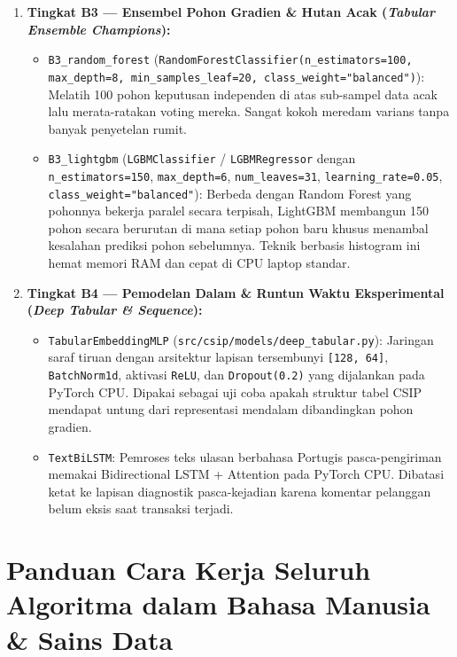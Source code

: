 \documentclass[11pt,a4paper,oneside]{book}
\newcommand{\code}[1]{{\small\nolinkurl{#1}}}
\begin{document}
\begin{enumerate}
\begin{itemize}
      \item \code{B2_naive_bayes} (\code{GaussianNB()}): Pengklasifikasi probabilistik cepat dengan asumsi fitur saling independen satu sama lain. Sering kali kurang terkalibrasi secara probabilitas, tetapi berharga sebagai pembanding berkecepatan mikrodetik.
    \end{itemize}
  \item \textbf{Tingkat B3 --- Ensembel Pohon Gradien \& Hutan Acak (\emph{Tabular Ensemble Champions}):}
    \begin{itemize}
      \item \code{B3_random_forest} (\code{RandomForestClassifier(n_estimators=100, max_depth=8, min_samples_leaf=20, class_weight="balanced")}): Melatih 100 pohon keputusan independen di atas sub-sampel data acak lalu merata-ratakan voting mereka. Sangat kokoh meredam varians tanpa banyak penyetelan rumit.
      \item \code{B3_lightgbm} (\code{LGBMClassifier} / \code{LGBMRegressor} dengan \code{n_estimators=150}, \code{max_depth=6}, \code{num_leaves=31}, \code{learning_rate=0.05}, \code{class_weight="balanced"}): Berbeda dengan Random Forest yang pohonnya bekerja paralel secara terpisah, LightGBM membangun 150 pohon secara berurutan di mana setiap pohon baru khusus menambal kesalahan prediksi pohon sebelumnya. Teknik berbasis histogram ini hemat memori RAM dan cepat di CPU laptop standar.
    \end{itemize}
  \item \textbf{Tingkat B4 --- Pemodelan Dalam \& Runtun Waktu Eksperimental (\emph{Deep Tabular \& Sequence}):}
    \begin{itemize}
      \item \code{TabularEmbeddingMLP} (\code{src/csip/models/deep_tabular.py}): Jaringan saraf tiruan dengan arsitektur lapisan tersembunyi \code{[128, 64]}, \code{BatchNorm1d}, aktivasi \code{ReLU}, dan \code{Dropout(0.2)} yang dijalankan pada PyTorch CPU. Dipakai sebagai uji coba apakah struktur tabel CSIP mendapat untung dari representasi mendalam dibandingkan pohon gradien.
      \item \code{TextBiLSTM}: Pemroses teks ulasan berbahasa Portugis pasca-pengiriman memakai Bidirectional LSTM + Attention pada PyTorch CPU. Dibatasi ketat ke lapisan diagnostik pasca-kejadian karena komentar pelanggan belum eksis saat transaksi terjadi.
    \end{itemize}
\end{enumerate}

\section{Panduan Cara Kerja Seluruh Algoritma dalam Bahasa Manusia \& Sains Data}
\end{document}
